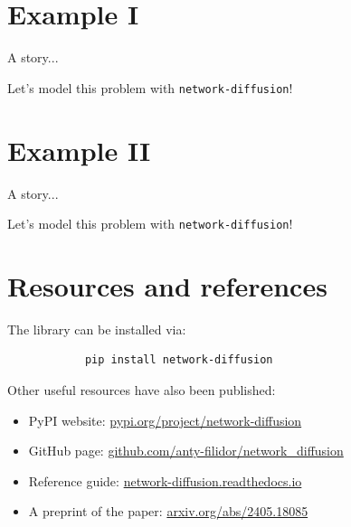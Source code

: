 \documentclass{beamer}
\begin{document}
\section{Example I}

\begin{frame}{\secname}
    A story...
\end{frame}

\begin{frame}{\secname}
    \begin{center}
        \large Let's model this problem with \lstinline[style=py]{network-diffusion}!
    \end{center}
\end{frame}

\section{Example II}

\begin{frame}{\secname}
    A story...
\end{frame}

\begin{frame}{\secname}
    \begin{center}
        \large Let's model this problem with \lstinline[style=py]{network-diffusion}!
    \end{center}
\end{frame}

\section{Resources and references}

\begin{frame}[fragile]{\secname}
    The library can be installed via:
    \begin{center}
        \large
        \begin{verbatim}
            pip install network-diffusion
        \end{verbatim}
    \end{center}
    Other useful resources have also been published:
    \begin{itemize}
        \item PyPI website: \url{pypi.org/project/network-diffusion}
        \item GitHub page: \url{github.com/anty-filidor/network_diffusion}
        \item Reference guide: \url{network-diffusion.readthedocs.io}
        \item A preprint of the paper: \url{arxiv.org/abs/2405.18085}
    \end{itemize}
\end{frame}
\end{document}
